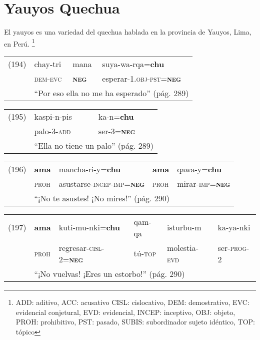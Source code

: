 \section*{Yauyos Quechua}

\noindent El yauyos es una variedad del quechua hablada en la provincia de Yauyos, Lima, en Perú.
\footnote{ADD: aditivo, ACC: acusativo CISL: cislocativo, DEM: demostrativo, EVC: evidencial conjetural, EVD: evidencial, INCEP: inceptivo, OBJ: objeto, PROH: prohibitivo, PST: pasado, SUBIS: subordinador sujeto idéntico, TOP: tópico}
\vspace{0.1cm}

{\setmainfont{Charis SIL}

\noindent \begin{tabular}{llll}
(194) & chay-tri & mana & suya-wa-rqa=\textbf{chu} \\
& \textsc{dem-evc} & \textsc{\textbf{neg}} & esperar-\textsc{1.obj-pst=\textbf{neg}} \\
& \multicolumn{3}{l}{``Por eso ella no me ha esperado'' (pág. 289)}
\end{tabular} \vspace{0.1cm}

\noindent \begin{tabular}{lll}
(195) & kaspi-n-pis & ka-n=\textbf{chu} \\
& palo-\textsc{3-add} & ser-\textsc{3=\textbf{neg}}\\
& \multicolumn{2}{l}{``Ella no tiene un palo'' (pág. 289)}
\end{tabular} \vspace{0.1cm}

\noindent \begin{tabular}{lllll}
(196) & \textbf{ama} & mancha-ri-y=\textbf{chu} & \textbf{ama} & qawa-y=\textbf{chu} \\
& \textsc{proh} & asustarse-\textsc{incep-imp=\textbf{neg}} & \textsc{proh} & mirar-\textsc{imp=\textbf{neg}} \\
& \multicolumn{4}{l}{``¡No te asustes! ¡No mires!'' (pág. 290)}
\end{tabular} \vspace{0.1cm}

\noindent \begin{tabular}{llllll}
(197) & \textbf{ama} & kuti-mu-nki=\textbf{chu} & qam-qa & isturbu-m & ka-ya-nki \\
& \textsc{proh} & regresar-\textsc{cisl-2=\textbf{neg}} & tú-\textsc{top} & molestia-\textsc{evd} & ser-\textsc{prog-2} \\
& \multicolumn{5}{l}{``¡No vuelvas! ¡Eres un estorbo!'' (pág. 290)}
\end{tabular} \vspace{0.1cm}

}
